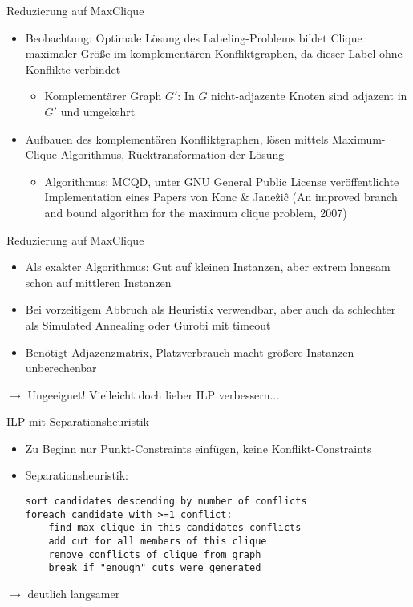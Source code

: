 \documentclass[ngerman,aspectratio=169,10pt]{beamer}
\begin{document}
\begin{frame}{Reduzierung auf MaxClique}
    \begin{itemize}
        \item Beobachtung: Optimale Lösung des Labeling-Problems bildet Clique maximaler Größe im komplementären Konfliktgraphen, da dieser Label ohne Konflikte verbindet
        \begin{itemize}
            \item Komplementärer Graph $G'$: In $G$ nicht-adjazente Knoten sind adjazent in $G'$ und umgekehrt
        \end{itemize}
        \pause
        \item Aufbauen des komplementären Konfliktgraphen, lösen mittels Maximum-Clique-Algorithmus, Rücktransformation der Lösung
        \begin{itemize}
            \item Algorithmus: MCQD, unter GNU General Public License veröffentlichte Implementation eines Papers von Konc \& Jane\^{z}i\^{c} (An improved branch and bound algorithm for the maximum clique problem, 2007)
        \end{itemize}
    \end{itemize}
\end{frame}

\begin{frame}{Reduzierung auf MaxClique}
    \begin{itemize}
        \item Als exakter Algorithmus: Gut auf kleinen Instanzen, aber extrem langsam schon auf mittleren Instanzen
        \item Bei vorzeitigem Abbruch als Heuristik verwendbar, aber auch da schlechter als Simulated Annealing oder Gurobi mit timeout
        \item Benötigt Adjazenzmatrix, Platzverbrauch macht größere Instanzen unberechenbar
    \end{itemize}
    $\longrightarrow$ Ungeeignet! Vielleicht doch lieber ILP verbessern...
\end{frame}

\begin{frame}[fragile]{ILP mit Separationsheuristik}
    \begin{itemize}
        \item Zu Beginn nur Punkt-Constraints einfügen, keine Konflikt-Constraints
        \item Separationsheuristik:
        \begin{verbatim}
sort candidates descending by number of conflicts
foreach candidate with >=1 conflict:
    find max clique in this candidates conflicts
    add cut for all members of this clique
    remove conflicts of clique from graph
    break if "enough" cuts were generated
        \end{verbatim}
    \end{itemize}
    \pause
    $\longrightarrow$ deutlich langsamer
\end{frame}
\end{document}
